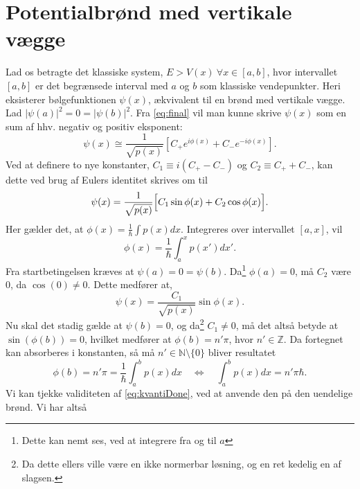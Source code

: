 \section{Potentialbrønd med vertikale vægge}
Lad os betragte det klassiske system, $E > V(x) \ \forall x \in[a,b]$, hvor intervallet $[a,b]$ er det begrænsede interval med $a$ og $b$ som klassiske vendepunkter. Heri eksisterer bølgefunktionen $\psi(x)$, ækvivalent til en brønd med vertikale vægge. Lad $|\psi(a)|^{2} = 0 = |\psi(b)|^{2}$. Fra \cref{eq:final} vil man kunne skrive $\psi(x)$ som en sum af hhv. negativ og positiv eksponent:
\begin{equation}
    \psi(x) \cong \frac{1}{\sqrt{p(x)}}\left[C_{+}e^{i\phi(x)}+C_{-}e^{-i\phi(x)}\right].
  \label{eq:kvantiseringStart}
\end{equation}
Ved at definere to nye konstanter, $C_1 \equiv i(C_{+}-C_{-})$ og $C_2 \equiv C_{+}+C_{-}$, kan dette ved brug af Eulers identitet skrives om til
\begin{equation}
  \psi(x) = \frac{1}{\sqrt{p(x)}}
  \Bigl[    C_1\sin{\phi(x)} + C_2\cos{\phi(x)}   \Bigr].
  \label{eq:kvantiseringSinCos}
\end{equation}
Her gælder det, at $\phi(x) = \frac{1}{\hbar}\int p(x) dx$. Integreres over intervallet $[a, x]$, vil
\begin{equation}
  \phi(x) = \frac{1}{\hbar}\int_{a}^{x} p(x')dx'.
\end{equation}
Fra startbetingelsen kræves at $\psi(a) = 0 = \psi(b)$. Da\footnote{Dette kan nemt ses, ved at integrere fra og til $a$} $\phi(a) = 0$, må $C_2$ være 0, da $\cos(0)\neq 0$. Dette medfører at,
\begin{equation}
    \psi(x) = \frac{C_1}{\sqrt{p(x)}}\sin{\phi(x)}.
\end{equation}
Nu skal det stadig gælde at $\psi(b) = 0$, og da\footnote{Da dette ellers ville være en ikke normerbar løsning, og en ret kedelig en af slagsen.} $C_1\neq 0$, må det altså betyde at $\sin(\phi(b)) = 0$, hvilket medfører at $\phi(b) = n'\pi$, hvor $n' \in \mathbb{Z}$. Da fortegnet kan absorberes i konstanten, så må $n' \in \mathbb{N} \setminus \{0\}$ bliver resultatet
\begin{equation}
    \phi(b) = n'\pi = \frac{1}{\hbar}\int_{a}^{b} p(x) dx \quad \Leftrightarrow \quad \int_{a}^{b} p(x) dx = n'\pi\hbar.
  \label{eq:kvantiDone}
\end{equation}
Vi kan tjekke validiteten af \cref{eq:kvantiDone}, ved at anvende den på den uendelige brønd. Vi har altså
